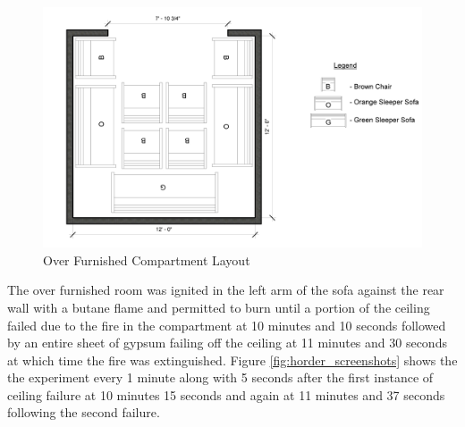 \documentclass{article}
\begin{document}
\begin{figure}[H]
	\centering
	\includegraphics[width=5in]{0_Images/Vent_Limited_Room/HorderRoom.jpg}
	\caption{Over Furnished Compartment Layout}
	\label{fig:horder_layout}
\end{figure}

The over furnished room was ignited in the left arm of the sofa against the rear wall with a butane flame and permitted to burn until a portion of the ceiling failed due to the fire in the compartment at 10 minutes and 10 seconds followed by an entire sheet of gypsum failing off the ceiling at 11 minutes and 30 seconds at which time the fire was extinguished. Figure \ref{fig:horder_screenshots} shows the the experiment every 1 minute along with 5 seconds after the first instance of ceiling failure at 10 minutes 15 seconds and again at 11 minutes and 37 seconds following the second failure.
\end{document}
